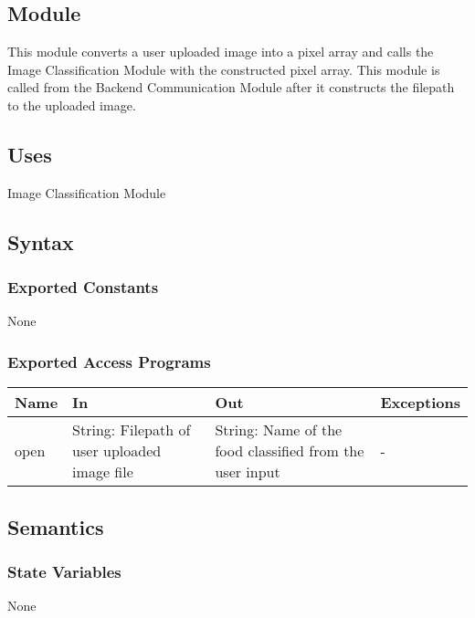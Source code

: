 \documentclass[12pt, titlepage]{article}
\begin{document}
\subsection{Module}

This module converts a user uploaded image into a pixel array and calls the Image Classification Module with the constructed pixel array. This module is called from the Backend Communication Module after it constructs the filepath to the uploaded image.

\subsection{Uses}

Image Classification Module

\subsection{Syntax}

\subsubsection{Exported Constants}

None

\subsubsection{Exported Access Programs}

\begin{center}
\begin{tabular}{p{2cm} p{4cm} p{4cm} p{2cm}}
\hline
\textbf{Name} & \textbf{In} & \textbf{Out} & \textbf{Exceptions} \\
\hline
open & String: Filepath of user uploaded image file & String: Name of the
food classified from
the user input & - \\
\hline
\end{tabular}
\end{center}

\subsection{Semantics}

\subsubsection{State Variables}

None
\end{document}

